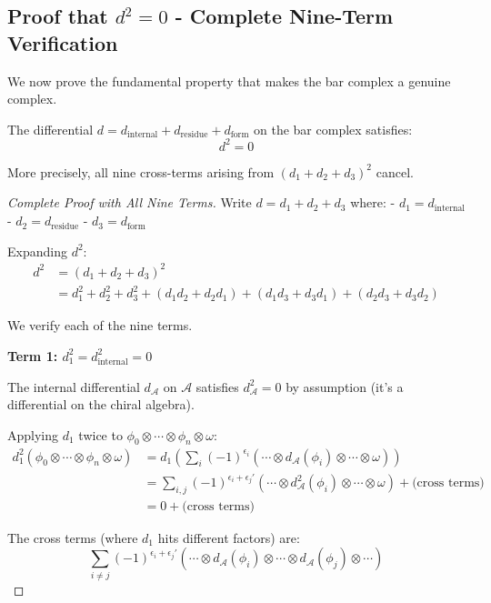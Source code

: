 \subsection{Proof that $d^2 = 0$ - Complete Nine-Term Verification}

We now prove the fundamental property that makes the bar complex a genuine complex.

\begin{theorem}\label{thm:bar-nilpotency-complete}
The differential $d = d_{\text{internal}} + d_{\text{residue}} + d_{\text{form}}$ on the bar complex satisfies:
$$d^2 = 0$$

More precisely, all nine cross-terms arising from $(d_1 + d_2 + d_3)^2$ cancel.
\end{theorem}

\begin{proof}[Complete Proof with All Nine Terms]
Write $d = d_1 + d_2 + d_3$ where:
- $d_1 = d_{\text{internal}}$
- $d_2 = d_{\text{residue}}$
- $d_3 = d_{\text{form}}$

Expanding $d^2$:
\begin{align*}
d^2 &= (d_1 + d_2 + d_3)^2 \\
&= d_1^2 + d_2^2 + d_3^2 + (d_1 d_2 + d_2 d_1) + (d_1 d_3 + d_3 d_1) + (d_2 d_3 + d_3 d_2)
\end{align*}

We verify each of the nine terms.

\medskip
\noindent\textbf{Term 1: $d_1^2 = d_{\text{internal}}^2 = 0$}

The internal differential $d_\mathcal{A}$ on $\mathcal{A}$ satisfies $d_\mathcal{A}^2 = 0$ by assumption (it's a differential on the chiral algebra).

Applying $d_1$ twice to $\phi_0 \otimes \cdots \otimes \phi_n \otimes \omega$:
\begin{align*}
d_1^2(\phi_0 \otimes \cdots \otimes \phi_n \otimes \omega) &= d_1\left(\sum_i (-1)^{\epsilon_i} (\cdots \otimes d_\mathcal{A}(\phi_i) \otimes \cdots \otimes \omega)\right) \\
&= \sum_{i,j} (-1)^{\epsilon_i + \epsilon_j'} (\cdots \otimes d_\mathcal{A}^2(\phi_i) \otimes \cdots \otimes \omega) + \text{(cross terms)} \\
&= 0 + \text{(cross terms)}
\end{align*}

The cross terms (where $d_1$ hits different factors) are:
$$\sum_{i \neq j} (-1)^{\epsilon_i + \epsilon_j'} (\cdots \otimes d_\mathcal{A}(\phi_i) \otimes \cdots \otimes d_\mathcal{A}(\phi_j) \otimes \cdots)$$


\end{proof}
